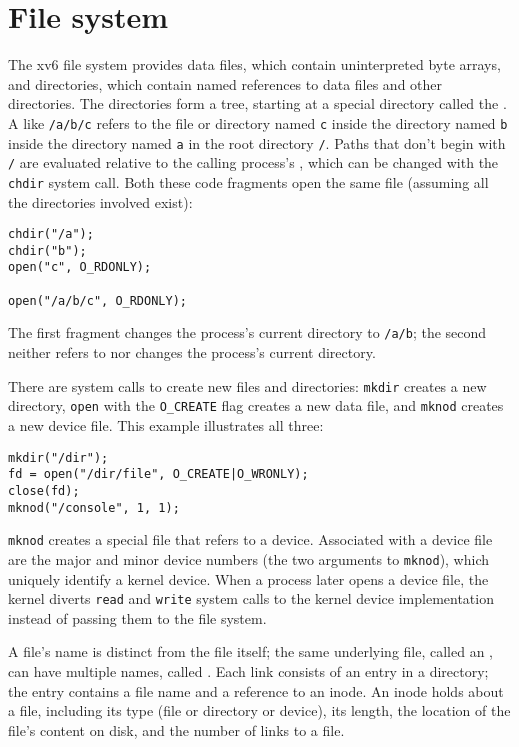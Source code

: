 \section{File system}

The xv6 file system provides data files,
which contain uninterpreted byte arrays,
and directories, which
contain named references to data files and other directories.
The directories form a tree, starting
at a special directory called the 
.
A 
like
\lstinline{/a/b/c}
refers to the file or directory named
\lstinline{c}
inside the directory named
\lstinline{b}
inside the directory named
\lstinline{a}
in the root directory
\lstinline{/}.
Paths that don't begin with
\lstinline{/}
are evaluated relative to the calling process's
,
which can be changed with the
\lstinline{chdir}
system call.
Both these code fragments open the same file
(assuming all the directories involved exist):
\begin{lstlisting}[]
chdir("/a");
chdir("b");
open("c", O_RDONLY);

open("/a/b/c", O_RDONLY);
\end{lstlisting}
The first fragment changes the process's current directory to
\lstinline{/a/b};
the second neither refers to nor changes the process's current directory.

There are system calls to create new files and directories:
\lstinline{mkdir}
creates a new directory,
\lstinline{open}
with the
\lstinline{O_CREATE}
flag creates a new data file,
and
\lstinline{mknod}
creates a new device file.
This example illustrates all three:
\begin{lstlisting}[]
mkdir("/dir");
fd = open("/dir/file", O_CREATE|O_WRONLY);
close(fd);
mknod("/console", 1, 1);
\end{lstlisting}
\lstinline{mknod}
creates a special file that refers to a device.
Associated with a device file are
the major and minor device numbers
(the two arguments to 
\lstinline{mknod}),
which uniquely identify a kernel device.
When a process later opens a device file, the kernel
diverts
\lstinline{read}
and
\lstinline{write}
system calls to the kernel device implementation
instead of passing them to the file system.

A file's name is distinct from the file itself;
the same underlying file, called an 
, 
can have multiple names,
called 
.
Each link consists of an entry in a directory;
the entry contains a file name and a reference
to an inode.
An inode holds
about a file, including
its type (file or directory or device),
its length,
the location of the file's content on disk,
and the number of links to a file.

